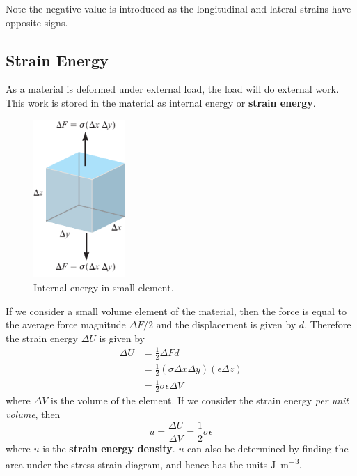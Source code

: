 \documentclass{article}
\begin{document}
Note the negative value is introduced as the longitudinal and lateral strains have opposite signs.
\subsection{Strain Energy}
As a material is deformed under external load, the load will do external work.
This work is stored in the material as internal energy or \textbf{strain energy}.
\begin{figure}[H]
    \centering
    \includegraphics[height = 6cm, keepaspectratio = true]{figures/strain_energy.pdf}
    \caption{Internal energy in small element.}
\end{figure}
If we consider a small volume element of the material, then the force is equal to the
average force magnitude \(\Delta F / 2\) and the displacement is given by
\(d\). Therefore the strain energy \(\Delta U\) is given by
\begin{align*}
    \Delta U & = \frac{1}{2} \Delta F d                                                               \\
             & = \frac{1}{2} \left( \sigma \Delta x \Delta y \right) \left( \epsilon \Delta z \right) \\
             & = \frac{1}{2} \sigma \epsilon \Delta V
\end{align*}
where \(\Delta V\) is the volume of the element. If we consider the strain energy
\textit{per unit volume}, then
\begin{equation*}
    u = \frac{\Delta U}{\Delta V} = \frac{1}{2} \sigma \epsilon
\end{equation*}
where \(u\) is the \textbf{strain energy density}. \(u\) can also be determined
by finding the area under the stress-strain diagram, and hence has the units \unit{J.m^{-3}}.
\end{document}

